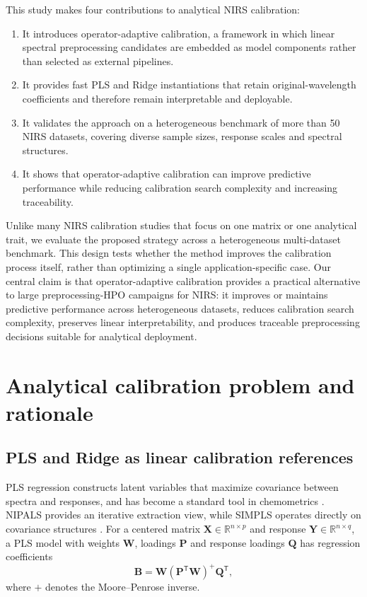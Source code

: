 \documentclass[11pt,a4paper]{article}
\newcommand{\X}{\mathbf{X}}
\newcommand{\Y}{\mathbf{Y}}
\newcommand{\B}{\mathbf{B}}
\newcommand{\R}{\mathbb{R}}
\newcommand{\transpose}{^{\mathsf T}}
\begin{document}
This study makes four contributions to analytical NIRS calibration:
\begin{enumerate}
  \item It introduces operator-adaptive calibration, a framework in which
  linear spectral preprocessing candidates are embedded as model components
  rather than selected as external pipelines.
  \item It provides fast PLS and Ridge instantiations that retain
  original-wavelength coefficients and therefore remain interpretable and
  deployable.
  \item It validates the approach on a heterogeneous benchmark of more than 50
  NIRS datasets, covering diverse sample sizes, response scales and spectral
  structures.
  \item It shows that operator-adaptive calibration can improve predictive
  performance while reducing calibration search complexity and increasing
  traceability.
\end{enumerate}

Unlike many NIRS calibration studies that focus on one matrix or one analytical
trait, we evaluate the proposed strategy across a heterogeneous multi-dataset
benchmark.  This design tests whether the method improves the calibration
process itself, rather than optimizing a single application-specific case.  Our
central claim is that operator-adaptive calibration provides a practical
alternative to large preprocessing-HPO campaigns for NIRS: it improves or
maintains predictive performance across heterogeneous datasets, reduces
calibration search complexity, preserves linear interpretability, and produces
traceable preprocessing decisions suitable for analytical deployment.

\section{Analytical calibration problem and rationale}

\subsection{PLS and Ridge as linear calibration references}

PLS regression constructs latent variables that maximize covariance between
spectra and responses, and has become a standard tool in chemometrics
\citep{geladi1986partial,wold2001pls}.  NIPALS provides an iterative extraction
view, while SIMPLS operates directly on covariance structures
\citep{dejong1993simpls}.  For a centered matrix $\X\in\R^{n\times p}$ and
response $\Y\in\R^{n\times q}$, a PLS model with weights $\mathbf W$,
loadings $\mathbf P$ and response loadings $\mathbf Q$ has regression
coefficients
\begin{equation}
  \B = \mathbf W(\mathbf P\transpose \mathbf W)^+ \mathbf Q\transpose ,
\end{equation}
where $+$ denotes the Moore--Penrose inverse.
\end{document}
